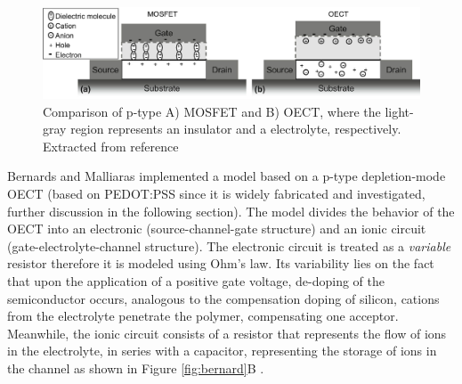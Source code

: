 \begin{figure}[h]
  \centering
  \includegraphics[width=\textwidth]{Images/pdf/MOSFETvsOECTs.pdf}
  \caption[Device physics of MOSFET vs OECT]{Comparison of p-type A) MOSFET and B) OECT, where the light-gray region represents an insulator and a electrolyte, respectively. Extracted from reference  \cite{friedleinDevicePhysicsOrganic2018}}
  \label{fig:vsMOS}
\end{figure}

Bernards and Malliaras implemented a model based on a p-type depletion-mode OECT (based on PEDOT:PSS since it is widely fabricated and investigated, further discussion in the following section). The model divides the behavior of the OECT into an electronic (source-channel-gate structure) and an ionic circuit (gate-electrolyte-channel structure). The electronic circuit is treated as a \textit{variable} resistor therefore it is modeled using Ohm's law. Its variability lies on the fact that upon the application of a positive gate voltage, de-doping of the semiconductor occurs, analogous to the compensation doping of silicon, cations from the electrolyte penetrate the polymer, compensating one acceptor. Meanwhile, the ionic circuit consists of a resistor that represents the flow of ions in the electrolyte, in series with a capacitor, representing the storage of ions in the channel as shown in Figure \ref{fig:bernard}B  \cite{rivnayOrganicElectrochemicalTransistors2018}\cite{bernardsSteadyStateTransientBehavior2007}. 

